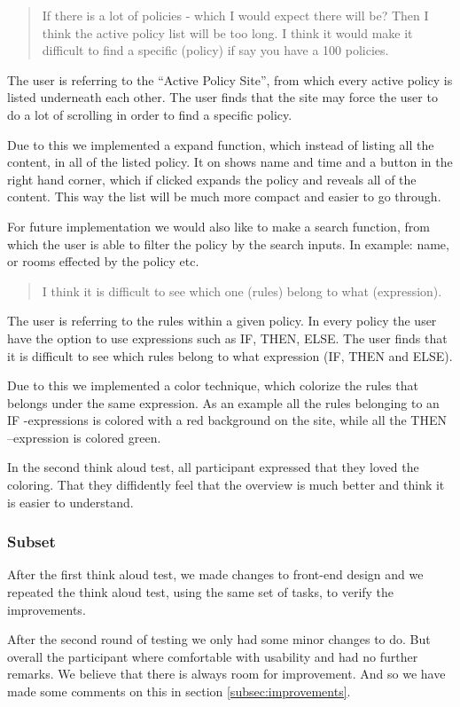 \begin{quotation}
If there is a lot of policies - which I would expect there will be? Then I think the active policy list will be too long. I think it would make it difficult to find a specific (policy) if say you have a 100 policies.
\end{quotation}

The user is referring to the “Active Policy Site”, from which every active policy is listed underneath each other. The user finds that the site may force the user to do a lot of scrolling in order to find a specific policy.

Due to this we implemented a expand function, which instead of listing all the content, in all of the listed policy. It on shows name and time and a button in the right hand corner, which if clicked expands the policy and reveals all of the content. This way the list will be much more compact and easier to go through. 

For future implementation we would also like to make a search function, from which the user is able to filter the policy by the search inputs. In example: name, or rooms effected  by the policy etc.
 
\begin{quotation}
I think it is difficult to see which one (rules) belong to what (expression).
\end{quotation}

The user is referring to the rules within a given policy. In every policy the user have the option to use expressions such as IF, THEN, ELSE. The user finds that it is difficult to see which rules belong to what expression (IF, THEN and ELSE).

Due to this we implemented a color technique, which colorize the rules that belongs under the same expression. As an example all the rules belonging to an IF -expressions is colored with a red background on the site, while all the THEN –expression is colored green.

In the second think aloud test, all participant expressed that they loved the coloring. That they diffidently feel that the overview is much better and think it is easier to understand.

\subsubsection{Subset}
After the first think aloud test, we made changes to front-end design and we repeated the think aloud test, using the same set of tasks, to verify the improvements. 

After the second round of testing we only had some minor changes to do. But overall the participant where comfortable with usability and had no further remarks.
We believe that there is always room for improvement. And so we have made some comments on this in section \ref{subsec:improvements}.
 



